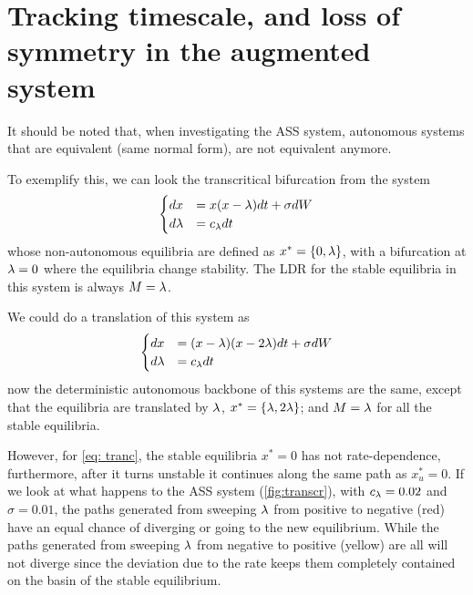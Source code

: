 \section{Tracking timescale, and loss of symmetry in the augmented system}

It should be noted that, when investigating the ASS system, autonomous systems that are equivalent (same normal form), are not equivalent anymore. 

To exemplify this, we can look the transcritical bifurcation from the system
\begin{equation}
	\begin{cases}
		dx & = x(x-\lambda)dt+\sigma dW\\
		d\lambda & =c_\lambda dt
	\end{cases}
	\label{eq: tranc}
\end{equation}
whose non-autonomous equilibria are defined as $x^*=\left\lbrace 0,\lambda\right\rbrace $, with a bifurcation at $\lambda=0$ where the equilibria change stability. The LDR for the stable equilibria in this system is always $M=\lambda$.

We could do a translation of this system as  
\begin{equation}
	\begin{cases}
		dx & = (x-\lambda)(x-2\lambda)dt+\sigma dW\\
		d\lambda & =c_\lambda dt
	\end{cases}
\label{eq: tranc_sl}
\end{equation}
now the deterministic autonomous backbone of this systems are the same, except that the equilibria are translated by $\lambda$, $x^*=\left\lbrace \lambda,2\lambda\right\rbrace $; and $M=\lambda$ for all the stable equilibria. 

However, for \cref{eq: tranc}, the stable equilibria $x^*={0}$ has not rate-dependence, furthermore, after it turns unstable it continues along the same path as $x^*_u={0}$. 
If we look at what happens to the ASS system (\cref{fig:transcr}), with $c_\lambda=0.02$ and $\sigma=0.01$, the paths generated from sweeping $\lambda$ from positive to negative (red) have an equal chance of diverging or going to the new equilibrium. 
While the  paths generated from sweeping $\lambda$ from negative to positive (yellow) are all will not diverge since the deviation due to the rate keeps them completely contained on the basin of the stable equilibrium.  


